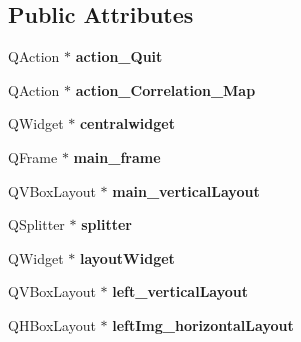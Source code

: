 \subsection*{Public Attributes}
\begin{DoxyCompactItemize}
\item 
\hypertarget{classUi__QcorrClass_ae725a71d3bb44a43e2d65ce4d1284b85}{
QAction $\ast$ {\bfseries action\_\-Quit}}
\label{classUi__QcorrClass_ae725a71d3bb44a43e2d65ce4d1284b85}

\item 
\hypertarget{classUi__QcorrClass_ae8508d05f75fac71c1f6fdb50fae6d7d}{
QAction $\ast$ {\bfseries action\_\-Correlation\_\-Map}}
\label{classUi__QcorrClass_ae8508d05f75fac71c1f6fdb50fae6d7d}

\item 
\hypertarget{classUi__QcorrClass_a885bdbbc4267078f102878ad126b23bb}{
QWidget $\ast$ {\bfseries centralwidget}}
\label{classUi__QcorrClass_a885bdbbc4267078f102878ad126b23bb}

\item 
\hypertarget{classUi__QcorrClass_acb93f5008511c2654ac8a51c17dc11ef}{
QFrame $\ast$ {\bfseries main\_\-frame}}
\label{classUi__QcorrClass_acb93f5008511c2654ac8a51c17dc11ef}

\item 
\hypertarget{classUi__QcorrClass_afd1d2aad88a740a9f33d9f91370c7ea9}{
QVBoxLayout $\ast$ {\bfseries main\_\-verticalLayout}}
\label{classUi__QcorrClass_afd1d2aad88a740a9f33d9f91370c7ea9}

\item 
\hypertarget{classUi__QcorrClass_ab4e96571e7dd58d9ec798cf6ede3cbe6}{
QSplitter $\ast$ {\bfseries splitter}}
\label{classUi__QcorrClass_ab4e96571e7dd58d9ec798cf6ede3cbe6}

\item 
\hypertarget{classUi__QcorrClass_a81e59812852e521cced5e1f912bffb99}{
QWidget $\ast$ {\bfseries layoutWidget}}
\label{classUi__QcorrClass_a81e59812852e521cced5e1f912bffb99}

\item 
\hypertarget{classUi__QcorrClass_ae7eb5196b5e392a40fa3e3a77f40c3cc}{
QVBoxLayout $\ast$ {\bfseries left\_\-verticalLayout}}
\label{classUi__QcorrClass_ae7eb5196b5e392a40fa3e3a77f40c3cc}

\item 
\hypertarget{classUi__QcorrClass_aaad53db0cbf018c38d75aebbe78959b3}{
QHBoxLayout $\ast$ {\bfseries leftImg\_\-horizontalLayout}}
\label{classUi__QcorrClass_aaad53db0cbf018c38d75aebbe78959b3}


\end{DoxyCompactItemize}
